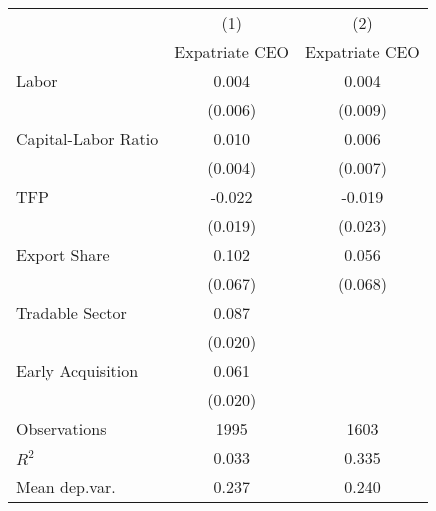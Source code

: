 \begin{tabular}{l*{2}{c}}
\hline\hline
                    &\multicolumn{1}{c}{(1)}&\multicolumn{1}{c}{(2)}\\
                    &\multicolumn{1}{c}{Expatriate CEO}&\multicolumn{1}{c}{Expatriate CEO}\\
\hline
Labor               &       0.004&       0.004\\
                    &     (0.006)&     (0.009)\\
[1em]
Capital-Labor Ratio &       0.010&       0.006\\
                    &     (0.004)&     (0.007)\\
[1em]
TFP                 &      -0.022&      -0.019\\
                    &     (0.019)&     (0.023)\\
[1em]
Export Share        &       0.102&       0.056\\
                    &     (0.067)&     (0.068)\\
[1em]
Tradable Sector     &       0.087&            \\
                    &     (0.020)&            \\
[1em]
Early Acquisition   &       0.061&            \\
                    &     (0.020)&            \\
\hline
Observations        &        1995&        1603\\
\(R^{2}\)           &       0.033&       0.335\\
Mean dep.var.       &       0.237&       0.240\\
\hline\hline
\end{tabular}
